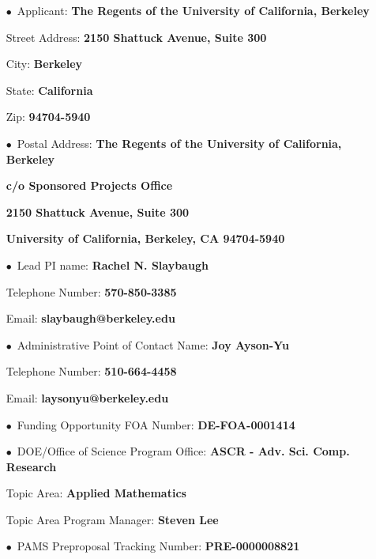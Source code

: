 \documentclass[12pt]{article}
\begin{document}
\begin{itemize}[noitemsep,topsep=0pt,parsep=-2pt,partopsep=20pt,labelwidth=5.5cm,align=left,
itemindent=5.5cm]
\item[$\bullet$\, Applicant:] 					{\bf The Regents of the University of California, Berkeley}
\item[\quad Street Address:] 					{\bf 2150 Shattuck Avenue, Suite 300 }
\item[\quad City:] 									{\bf Berkeley}
\item[\quad State:] 								{\bf California}
\item[\quad Zip:] 									{\bf 94704-5940}\vspace{12pt}
\item[$\bullet$\, Postal Address:] 			{\bf The Regents of the University of California, Berkeley}
\item[\quad] 								{\bf c/o Sponsored Projects Office}
\item[\quad] 								{\bf 2150 Shattuck Avenue, Suite 300}
\item[\quad] 								{\bf University of California, Berkeley, CA 94704-5940}
\end{itemize}
\vspace{-30pt}
\begin{itemize}[noitemsep,topsep=0pt,parsep=-2pt,partopsep=20pt,labelwidth=7.5cm,align=left,
itemindent=7.5cm]
\item[$\bullet$\, Lead PI name:] 			{\bf Rachel N. Slaybaugh}
\item[\quad Telephone Number:]			{\bf 570-850-3385}
\item[\quad Email:]									{\bf slaybaugh@berkeley.edu}\vspace{12pt}
\item[$\bullet$\, Administrative Point of Contact Name:] {\bf Joy Ayson-Yu}
\item[\quad Telephone Number:]			{\bf 510-664-4458}
\item[\quad Email:]									{\bf laysonyu@berkeley.edu }\vspace{12pt}
\item[$\bullet$\, Funding Opportunity FOA Number:] {\bf DE-FOA-0001414}\vspace{8pt}
\item[$\bullet$\, DOE/Office of Science Program Office:] {\bf ASCR - Adv. Sci.
 Comp. Research}
\item[\quad Topic Area:]							{\bf Applied Mathematics}
\item[\quad Topic Area Program Manager:] {\bf Steven Lee}\vspace{12pt}
\item[$\bullet$\, PAMS Preproposal Tracking Number:] {\bf PRE-0000008821}
\end{itemize}
\end{document}
